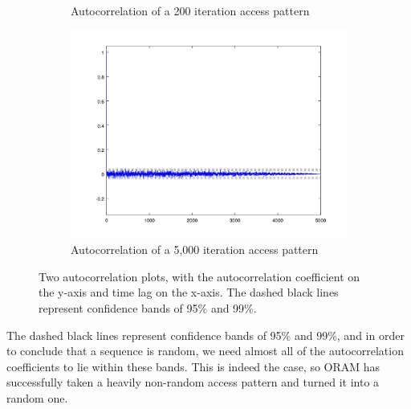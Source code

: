 \documentclass[12pt,a4paper,twoside,openright]{report}
\begin{document}
\begin{figure}
    \centering
    \begin{subfigure}{.45\textwidth}
        \centering
        \scalebox{0.9}{}
        \caption{Autocorrelation of a 200 iteration access pattern}
        \label{fig:shortAutocorr}
    \end{subfigure}
    \quad
    \begin{subfigure}{.45\textwidth}
        \centering
        \includegraphics[width=\linewidth]{longAutocorr}
        \caption{Autocorrelation of a 5,000 iteration access pattern}
        \label{fig:longAutocorr}
    \end{subfigure}
    \caption{Two autocorrelation plots, with the autocorrelation coefficient on the y-axis and time lag on the x-axis. The dashed black lines represent confidence bands of 95\% and 99\%.}
    \label{fig:autocorr}
\end{figure}

The dashed black lines represent confidence bands of 95\% and 99\%, and in order to conclude that a sequence is random, we need almost all of the autocorrelation coefficients to lie within these bands. This is indeed the case, so ORAM has successfully taken a heavily non-random access pattern and turned it into a random one.
\end{document}
